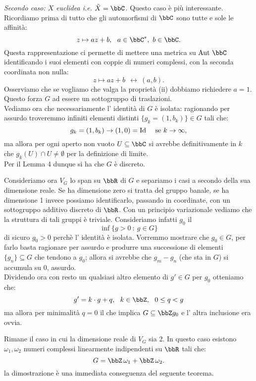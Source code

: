 {\it Secondo caso: $X$ euclidea i.e. $\tilde{X}=\bbC$.} Questo caso è più interessante. Ricordiamo prima di tutto che gli automorfismi di $\bbC$ sono tutte e sole le affinità:
$$
z\mapsto az+b,\ \ a\in\bbC^*,\ b\in \bbC.
$$
Questa rappresentazione ci permette di mettere una metrica su $\Aut{\bbC}$ identificando i suoi elementi con coppie di numeri complessi, con la seconda coordinata non nulla:
$$
z\mapsto az+b\ \ \leftrightarrow\  (a,b).
$$
Osserviamo che se vogliamo che valga la proprietà (ii) dobbiamo richiedere $a=1$. Questo forza $G$ ad essere un sottogruppo di traslazioni.\\
Vediamo ora che necessariamente l' identità di $G$ è isolata: ragionando per assurdo troveremmo infiniti elementi distinti $\{ g_k=(1,b_k) \}\in G$ tali che:
$$
g_k=(1,b_k)\rightarrow (1,0)=\Id\ \ \ \mbox{ se } k \rightarrow \infty,
$$  
ma allora per ogni aperto non vuoto $U\subseteq \bbC$ si avrebbe definitivamente in $k$ che $g_k(U)\cap U\neq \emptyset$ per la definizione di limite.\\
Per il Lemma 4 dunque si ha che $G$ è discreto.

Consideriamo ora $V_G$ lo span su $\bbR$ di $G$ e separiamo i casi a secondo della sua dimensione reale. Se ha dimensione zero si tratta del gruppo banale, se ha dimensione 1 invece possiamo identificarlo, passando in coordinate, con un sottogruppo additivo discreto di $\bbR$. Con un principio variazionale vediamo che la struttura di tali gruppi è triviale. Consideriamo infatti $g_0$ il
$$
\inf\{g>0\ :\ g\in G\}
$$
di sicuro $g_0>0$ perchè l' identità è isolata. Vorremmo mostrare che $g_0\in G$, per farlo basta ragionare per assurdo e produrre una successione di elementi $\{g_n\}\subseteq G $ che tendono a $g_0$; allora si avrebbe che $g_m-g_n$ (che sta in $G$) si accumula su $0$, assurdo.\\
Dividendo ora con resto un qualsiasi altro elemento di $g'\in G$ per $g_0$ otteniamo che:
$$
g'=k\cdot g+q,\ \ k\in \bbZ,\ \ 0\leq q <g
$$ 
ma allora per minimalità $q=0$ il che implica $G\subseteq \bbZ g_0$ e l' altra inclusione era ovvia.

Rimane il caso in cui la dimensione reale di $V_G$ sia 2. In questo caso esistono $\omega_1,\omega_2$ numeri complessi linearmente indipendenti su $\bbR$ tali che:
$$
G=\bbZ\, \omega_1+\bbZ\, \omega_2.
$$
la dimostrazione è una immediata conseguenza del seguente teorema.

